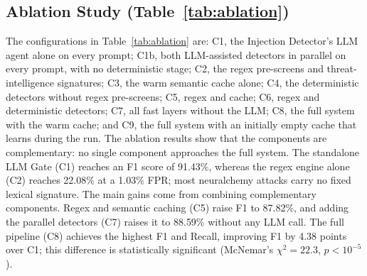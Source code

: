 \documentclass[runningheads]{llncs}
\newif\ifrev
\newcommand{\rev}[1]{\ifrev\hl{#1}\else#1\fi}                  %
\begin{document}
\subsection{Ablation Study (Table~\ref{tab:ablation})}
\rev{The configurations in Table~\ref{tab:ablation} are: C1, the Injection Detector's LLM agent alone on every prompt; C1b, both LLM-assisted detectors in parallel on every prompt, with no deterministic stage; C2, the regex pre-screens and threat-intelligence signatures; C3, the warm semantic cache alone; C4, the deterministic detectors without regex pre-screens; C5, regex and cache; C6, regex and deterministic detectors; C7, all fast layers without the LLM; C8, the full system with the warm cache; and C9, the full system with an initially empty cache that learns during the run.} The ablation results show \rev{that the components are complementary: no single component approaches the full system}. \rev{The standalone LLM Gate (C1) reaches an F1 score of 91.43\%, whereas the regex engine alone (C2) reaches 22.08\% at a 1.03\% FPR; most neuralchemy attacks carry no fixed lexical signature.} The main gains come from combining complementary components.
Regex and semantic caching (C5) \rev{raise F1 to 87.82\%}, \rev{and adding the parallel detectors (C7) raises it to 88.59\% without any LLM call}. The full pipeline
(C8) achieves the highest F1 and Recall, improving F1 by \rev{4.38} points
over C1; this difference is statistically significant
(McNemar's \rev{$\chi^2=22.3$, $p<10^{-5}$}).\\
\end{document}
